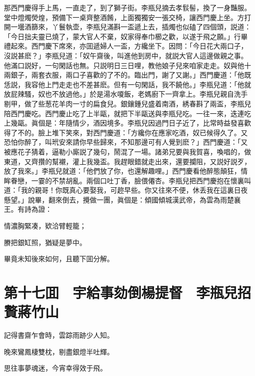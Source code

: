 那西門慶得手上馬，一直走了，到了獅子街。李瓶兒摘去孝䯼髻，換了一身豔服。堂中燈燭熒煌，預備下一桌齊整酒餚，上面獨獨安一張交椅，讓西門慶上坐。方打開一壜酒篩來，丫鬟執壶，李瓶兒滿斟一盃遞上去，插燭也似磕了四個頭，説道：「今日拙夫靈已燒了，蒙大官人不棄，奴家得奉巾櫛之歡，以遂于飛之願。」行畢禮起來。西門慶下席來，亦囬遞婦人一盃，方纔坐下。因問：「今日花大兩口子，沒説甚麽？」李瓶兒道：「奴午齋後，叫進他到房中，就説大官人這邊做親之事。他滿口説好，一句閑話也無。只説明日三日哩，教他娘子兒來咱家走走。奴與他十兩銀子，兩套衣服，兩口子喜歡的了不的。臨出門，謝了又謝。」西門慶道：「他既恁説，我容他上門走走也不差甚麽。但有一句閑話，我不饒他。」李瓶兒道：「他就放屁辣騷，奴也不放過他。」於是湯水嗄飯，老媽廚下一齊拿上。李瓶兒親自洗手剔甲，做了些葱花羊肉一寸的扁食兒。銀鑲鍾兒盛着南酒，綉春斟了兩盃，李瓶兒陪西門慶吃。西門慶止吃了上半甌，就把下半甌送與李瓶兒吃。一往一來，迭連吃上幾甌。眞個是：年隨情少，酒因境多。李瓶兒因過門日子近了，比常時益發喜歡得了不的。臉上堆下笑來，對西門慶道：「方纔你在應家吃酒，奴已候得久了。又恐怕你醉了，叫玳安來請你早些歸來，不知那邊可有人覺到麽？」西門慶道：「又被應花子猜着，逼勒小廝説了幾句，鬧混了一場。諸弟兄要與我賀喜，喚唱的，做東道，又齊攢的幫襯，灌上我幾盃。我趕眼錯就走出來，還要攔阻，又説好説歹，放了我來。」李瓶兒就道：「他們放了你，也還解趣哩。」西門慶看他醉態顛狂，情眸眷戀，一霎的不禁胡亂。兩個口吐丁香，臉偎僊杏。李瓶兒把西門慶抱在懷裏叫道：「我的親哥！你既真心要娶我，可趂早些。你又往來不便，休丢我在這裏日夜懸望。」說畢，翻來倒去，攪做一團，眞個是：傾國傾城漢武帝，為雲為雨楚襄王。有詩為證：

情濃胸緊凑，欵洽臂輕籠；

賸把銀缸照，猶疑是夢中。

畢竟未知後來如何，且聽下囬分解。

\chapter*{第十七囬　宇給事劾倒楊提督　李瓶兒招贅蔣竹山}

記得書齋乍會時，雲踪雨跡少人知。

晚來鸞鳳棲雙枕，剔盡銀燈半吐輝。

思往事夢魂迷，今宵幸得效于飛。

